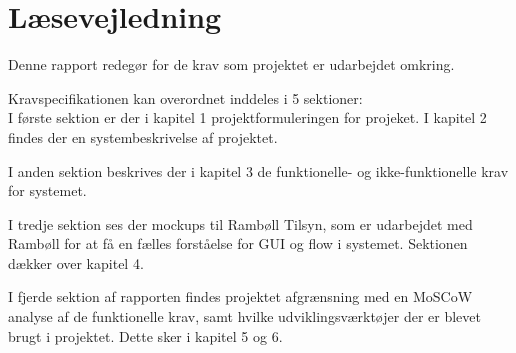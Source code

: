 \chapter*{Læsevejledning}
Denne rapport redegør for de krav som projektet er udarbejdet omkring. 

Kravspecifikationen kan overordnet inddeles i 5 sektioner:\\
I første sektion er der i kapitel 1 projektformuleringen for projeket. I kapitel 2 findes der en systembeskrivelse af projektet.

I anden sektion beskrives der i kapitel 3 de funktionelle- og ikke-funktionelle krav for systemet.

I tredje sektion ses der mockups til Rambøll Tilsyn, som er udarbejdet med Rambøll for at få en fælles forståelse for GUI og flow i systemet. 
Sektionen dækker over kapitel 4.

I fjerde sektion af rapporten findes projektet afgrænsning med en MoSCoW analyse af de funktionelle krav, samt hvilke udviklingsværktøjer der er blevet brugt i projektet. Dette sker i kapitel 5 og 6.


